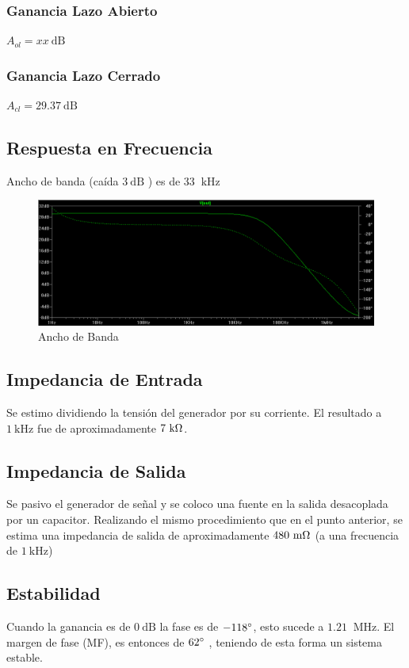\documentclass[a4paper,12pt,twoside]{article}
\newcommand{\khz}{\ensuremath{~\mathrm{kHz}}}
\newcommand{\kHz}{\ensuremath{~\mathrm{kHz}}}
\newcommand{\MHz}{\ensuremath{~\mathrm{MHz}}}
\newcommand{\mohm}{\ensuremath{~\mathrm{m}\ohm}}
\newcommand{\kohm}{\ensuremath{~\mathrm{k}\ohm}}
\newcommand{\dB}{\ensuremath{~\mathrm{dB}}}
\begin{document}
\subsubsection{Ganancia Lazo Abierto}
$A_{ol}=xx\dB$ 

\subsubsection{Ganancia Lazo Cerrado}
$A_{cl}=29.37\dB$ 

\subsection{Respuesta en Frecuencia}
Ancho de banda (caída $3 \dB$ ) es de 33 $\kHz$

\begin{figure}[H]
\centering
\includegraphics[scale=0.6]{img/ancho_de_banda}
\caption{Ancho de Banda}
\label{ancho_banda} 
\end{figure}

\subsection{Impedancia de Entrada}
Se estimo dividiendo la tensión del generador por su corriente. El resultado a $1 \kHz$ fue de aproximadamente $7 \kohm$.
\subsection{Impedancia de Salida}
Se pasivo el generador de señal y se coloco una fuente en la salida desacoplada por un capacitor. Realizando el mismo procedimiento que en el punto anterior, se estima una impedancia de salida de aproximadamente  $480 \mohm$ (a una frecuencia de $1 \khz$)

\subsection{Estabilidad}
Cuando la ganancia es de  $0\dB$ la fase es de $-118\degree$, esto sucede a $1.21$ $\MHz$.
El margen de fase (MF), es entonces de $62\degree$ , teniendo de esta forma un sistema estable.
\end{document}
